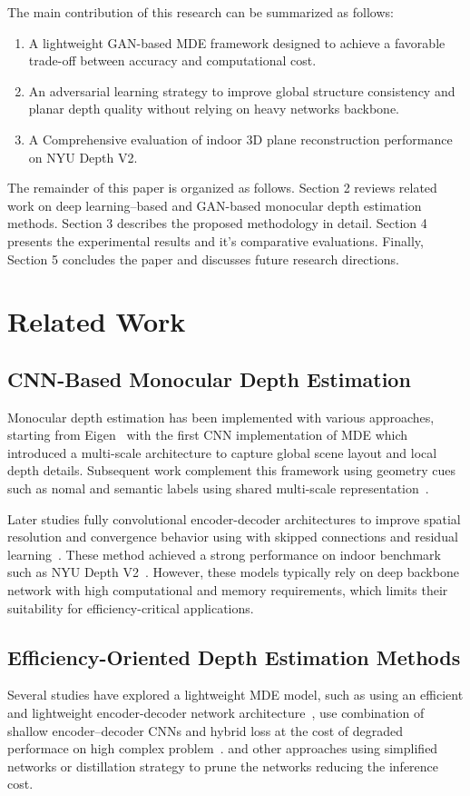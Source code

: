 \documentclass[a4paper,12pt]{article}
\begin{document}
The main contribution of this research can be summarized as follows:
\begin{enumerate}
    \item A lightweight GAN-based MDE framework designed to achieve a favorable trade-off between accuracy and computational cost.
    \item An adversarial learning strategy to improve global structure consistency and planar depth quality without relying on heavy networks backbone.
    \item A Comprehensive evaluation of indoor 3D plane reconstruction performance on NYU Depth V2.
\end{enumerate}

The remainder of this paper is organized as follows. Section 2 reviews related work on deep learning–based and GAN-based monocular depth estimation methods. 
Section 3 describes the proposed methodology in detail. Section 4 presents the experimental results and it's comparative evaluations. 
Finally, Section 5 concludes the paper and discusses future research directions.

\section{Related Work}
\subsection{CNN-Based Monocular Depth Estimation}
Monocular depth estimation has been implemented with various approaches, starting from Eigen~\cite{eigen14062283} with the first CNN implementation of MDE 
which introduced a multi-scale architecture to capture global scene layout and local depth details. 
Subsequent work complement this framework using geometry cues such as nomal and semantic labels using shared multi-scale representation~\cite{lee2021bigsmallmultiscalelocal}.

Later studies fully convolutional encoder-decoder architectures to improve spatial resolution and convergence behavior using with skipped connections and residual learning~\cite{zhang2019patternaffinitivepropagationdepthsurface}.
These method achieved a strong performance on indoor benchmark such as NYU Depth V2~\cite{zhou2017unsupervisedlearningdepthegomotion}. 
However, these models typically rely on deep backbone network with high computational and memory requirements, which limits their suitability for efficiency-critical applications.

\subsection{Efficiency-Oriented Depth Estimation Methods}
Several studies have explored a lightweight MDE model, such as using an efficient and lightweight encoder-decoder network architecture~\cite{Wofk2019FastDepth},
use combination of shallow encoder–decoder CNNs and hybrid loss at the cost of degraded performace on high complex problem~\cite{dong2021mobilexnetefficientconvolutionalneural}.
and other approaches using simplified networks or distillation strategy to prune the networks reducing the inference cost.
\end{document}
